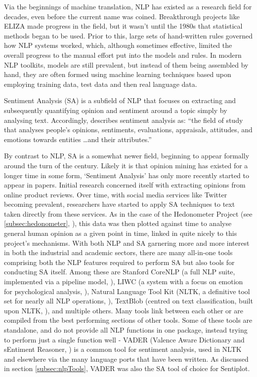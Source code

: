 \documentclass{article}
\begin{document}
{        Via the beginnings of machine translation, NLP has existed as a research field for decades, even before the current name was coined. Breakthrough projects like ELIZA \citep{eliza} made progress in the field, but it wasn't until the 1980s that statistical methods began to be used. Prior to this, large sets of hand-written rules governed how NLP systems worked, which, although sometimes effective, limited the overall progress to the manual effort put into the models and rules. In modern NLP toolkits, models are still prevalent, but instead of them being assembled by hand, they are often formed using machine learning techniques based upon employing training data, test data and then real language data.

        Sentiment Analysis (SA) is a subfield of NLP that focuses on extracting and subsequently quantifying opinion and sentiment around a topic simply by analysing text. Accordingly, \cite{liu2012sentiment} describes sentiment analysis as: ``the field of study that analyses people’s opinions, sentiments, evaluations, appraisals, attitudes, and emotions towards entities \dots and their attributes.''
        
        By contrast to NLP, SA is a somewhat newer field, beginning to appear formally around the turn of the century. Likely it is that opinion mining has existed for a longer time in some form, `Sentiment Analysis' has only more recently started to appear in papers. Initial research concerned itself with extracting opinions from online product reviews. Over time, with social media services like Twitter becoming prevalent, researchers have started to apply SA techniques to text taken directly from these services. As in the case of the Hedonometer Project (see \ref{subsec:hedonometer}, \cite{reagan2016emotional}), this data was then plotted against time to analyse general human opinion as a given point in time, linked in quite nicely to this project's mechanisms.
        With both NLP and SA garnering more and more interest in both the industrial and academic sectors, there are many all-in-one tools comprising both the NLP features required to perform SA but also tools for conducting SA itself. Among these are Stanford CoreNLP (a full NLP suite, implemented via a pipeline model, \cite{stanfordNLP}), LIWC (a system with a focus on emotion for psychological analysis, \cite{tausczik2010psychological}), Natural Language Tool Kit (NLTK, a definitive tool set for nearly all NLP operations, \cite{loper2002nltk}), TextBlob (centred on text classification, built upon NLTK, \cite{textblob}), and multiple others. Many tools link between each other or are compiled from the best performing sections of other tools. Some of these tools are standalone, and do not provide all NLP functions in one package, instead trying to perform just a single function well - VADER (Valence Aware Dictionary and sEntiment Reasoner, \cite{hutto2014vader}) is a common tool for sentiment analysis, used in NLTK and elsewhere via the many language ports that have been written. As discussed in section \ref{subsec:nlpTools}, VADER was also the SA tool of choice for Sentiplot.

}
\end{document}
